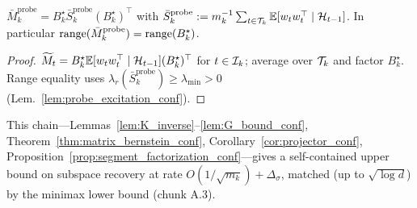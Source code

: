 \begin{proposition}
\label{prop:segment_factorization_conf}
$\bar M_k^{\mathrm{probe}} = B_k^\star\bar S_k^{\mathrm{probe}}(B_k^\star)^\top$
with $\bar S_k^{\mathrm{probe}}:=m_k^{-1}\sum_{t\in\mathcal{T}_k}\mathbb{E}[w_tw_t^\top\mid\mathcal{H}_{t-1}]$.
In particular $\mathrm{range}(\bar M_k^{\mathrm{probe}}) = \mathrm{range}(B_k^\star)$.
\end{proposition}
\begin{proof}
$\widetilde M_t = B_k^\star\mathbb{E}[w_tw_t^\top\mid\mathcal{H}_{t-1}](B_k^\star)^\top$
for $t\in\mathcal{I}_k$; average over $\mathcal{T}_k$ and factor $B_k^\star$. Range
equality uses $\lambda_r(\bar S_k^{\mathrm{probe}})\ge\lambda_{\min}>0$
(Lem.~\ref{lem:probe_excitation_conf}).
\end{proof}

This chain---Lemmas~\ref{lem:K_inverse}--\ref{lem:G_bound_conf},
Theorem~\ref{thm:matrix_bernstein_conf}, Corollary~\ref{cor:projector_conf},
Proposition~\ref{prop:segment_factorization_conf}---gives a
self-contained upper bound on subspace recovery at rate
$O(1/\sqrt{m_k})+\Delta_\sigma$, matched (up to $\sqrt{\log d}$) by
the minimax lower bound (chunk A.3).


